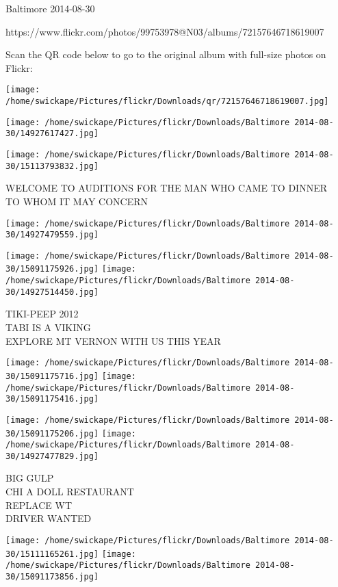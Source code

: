 \documentclass[10pt,letterpaper]{article}
\begin{document}
Baltimore 2014-08-30

https://www.flickr.com/photos/99753978@N03/albums/72157646718619007

Scan the QR code below to go to the original album with full-size photos on Flickr:

\texttt{[image: /home/swickape/Pictures/flickr/Downloads/qr/72157646718619007.jpg]}
\pagebreak

\texttt{[image: /home/swickape/Pictures/flickr/Downloads/Baltimore 2014-08-30/14927617427.jpg]}

\vspace{0.25in}
\texttt{[image: /home/swickape/Pictures/flickr/Downloads/Baltimore 2014-08-30/15113793832.jpg]}

WELCOME TO AUDITIONS FOR THE MAN WHO CAME TO DINNER\\
TO WHOM IT MAY CONCERN
\pagebreak

\texttt{[image: /home/swickape/Pictures/flickr/Downloads/Baltimore 2014-08-30/14927479559.jpg]}

\vspace{0.25in}
\texttt{[image: /home/swickape/Pictures/flickr/Downloads/Baltimore 2014-08-30/15091175926.jpg]}
\texttt{[image: /home/swickape/Pictures/flickr/Downloads/Baltimore 2014-08-30/14927514450.jpg]}

TIKI{-}PEEP 2012\\
TABI IS A VIKING\\
EXPLORE MT VERNON WITH US THIS YEAR
\pagebreak

\texttt{[image: /home/swickape/Pictures/flickr/Downloads/Baltimore 2014-08-30/15091175716.jpg]}
\texttt{[image: /home/swickape/Pictures/flickr/Downloads/Baltimore 2014-08-30/15091175416.jpg]}

\texttt{[image: /home/swickape/Pictures/flickr/Downloads/Baltimore 2014-08-30/15091175206.jpg]}
\texttt{[image: /home/swickape/Pictures/flickr/Downloads/Baltimore 2014-08-30/14927477829.jpg]}

BIG GULP\\
CHI A DOLL RESTAURANT\\
REPLACE WT\\
DRIVER WANTED
\pagebreak

\texttt{[image: /home/swickape/Pictures/flickr/Downloads/Baltimore 2014-08-30/15111165261.jpg]}
\texttt{[image: /home/swickape/Pictures/flickr/Downloads/Baltimore 2014-08-30/15091173856.jpg]}
\end{document}
